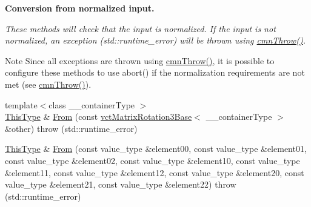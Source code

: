 \begin{Indent}{\bf Conversion from normalized input.}\par
{\em These methods will check that the input is normalized. If the input is not normalized, an exception ({\ttfamily std\-::runtime\-\_\-error}) will be thrown using \hyperlink{_minimal_cmn_8h_ad50e82cf9c9dbd0e6443c13e0d1a6f1a}{cmn\-Throw()}.

\begin{DoxyNote}{Note}
Since all exceptions are thrown using \hyperlink{_minimal_cmn_8h_ad50e82cf9c9dbd0e6443c13e0d1a6f1a}{cmn\-Throw()}, it is possible to configure these methods to use {\ttfamily abort()} if the normalization requirements are not met (see \hyperlink{_minimal_cmn_8h_ad50e82cf9c9dbd0e6443c13e0d1a6f1a}{cmn\-Throw()}). 
\end{DoxyNote}
}\begin{DoxyCompactItemize}
\item 
{\footnotesize template$<$class \-\_\-\-\_\-container\-Type $>$ }\\\hyperlink{classvct_matrix_rotation3_base_a027be766cb10ca3c2ad8e85c28ed0af9}{This\-Type} \& \hyperlink{classvct_matrix_rotation3_base_afb96603eae3080e013984aa908408f73}{From} (const \hyperlink{classvct_matrix_rotation3_base}{vct\-Matrix\-Rotation3\-Base}$<$ \-\_\-\-\_\-container\-Type $>$ \&other)  throw (std\-::runtime\-\_\-error)
\item 
\hyperlink{classvct_matrix_rotation3_base_a027be766cb10ca3c2ad8e85c28ed0af9}{This\-Type} \& \hyperlink{classvct_matrix_rotation3_base_a6a9a39413baedf9bd409f06d3cf330dd}{From} (const value\-\_\-type \&element00, const value\-\_\-type \&element01, const value\-\_\-type \&element02, const value\-\_\-type \&element10, const value\-\_\-type \&element11, const value\-\_\-type \&element12, const value\-\_\-type \&element20, const value\-\_\-type \&element21, const value\-\_\-type \&element22)  throw (std\-::runtime\-\_\-error)
\item 

\end{DoxyCompactItemize}
\end{Indent}
